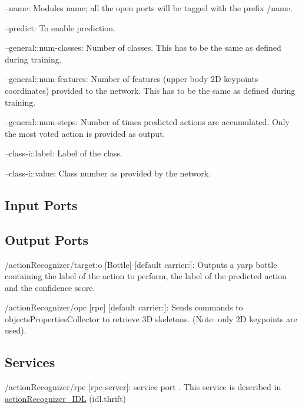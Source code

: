 \begin{DoxyItemize}
\item --name\+: Module\textquotesingle{}s name; all the open ports will be tagged with the prefix /name.
\item --predict\+: To enable prediction.
\item --general\+::num-\/classes\+: Number of classes. This has to be the same as defined during training.
\item --general\+::num-\/features\+: Number of features (upper body 2D keypoints\textquotesingle{} coordinates) provided to the network. This has to be the same as defined during training.
\item --general\+::num-\/steps\+: Number of times predicted actions are accumulated. Only the most voted action is provided as output.
\item --class-\/i\+::label\+: Label of the class.
\item --class-\/i\+::value\+: Class number as provided by the network. 
\end{DoxyItemize}\hypertarget{group__skeletonViewer_inputports_sec}{}\subsection{Input Ports}\label{group__skeletonViewer_inputports_sec}
\hypertarget{group__skeletonViewer_outputports_sec}{}\subsection{Output Ports}\label{group__skeletonViewer_outputports_sec}

\begin{DoxyItemize}
\item /action\+Recognizer/target\+:o \mbox{[}Bottle\mbox{]} \mbox{[}default carrier\+:\mbox{]}\+: Outputs a yarp bottle containing the label of the action to perform, the label of the predicted action and the confidence score.
\item /action\+Recognizer/opc \mbox{[}rpc\mbox{]} \mbox{[}default carrier\+:\mbox{]}\+: Sends commands to objects\+Properties\+Collector to retrieve 3D skeletons. (Note\+: only 2D keypoints are used).
\end{DoxyItemize}\hypertarget{group__skeletonViewer_services_sec}{}\subsection{Services}\label{group__skeletonViewer_services_sec}

\begin{DoxyItemize}
\item /action\+Recognizer/rpc \mbox{[}rpc-\/server\mbox{]}\+: service port . This service is described in \mbox{\hyperlink{classactionRecognizer__IDL}{action\+Recognizer\+\_\+\+I\+DL}} (idl.\+thrift) 
\end{DoxyItemize}